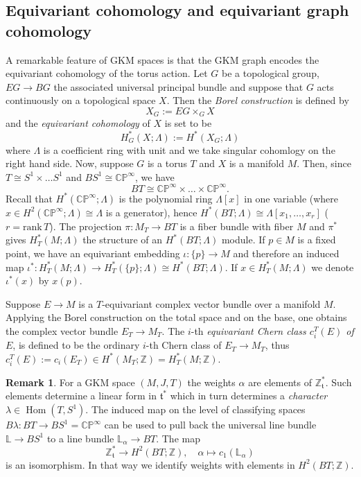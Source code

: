 \documentclass[12pt,a4paper]{amsart}
\theoremstyle{plain}
\theoremstyle{definition}
\newtheorem{rem}[thm]{Remark}
\begin{document}
\subsection{Equivariant cohomology and equivariant graph cohomology}
A remarkable feature of GKM spaces is that the GKM graph encodes the equivariant
cohomology of the torus action. Let $G$ be a topological group, $EG \to BG$ the associated universal principal bundle
and suppose that $G$ acts continuously on a topological space $X$. Then
the \emph{Borel construction} is defined by
\[
	X_{G} := EG \times_{G} X
\]
and the \emph{equivariant cohomology} of $X$ is set to be
\[
	H_{G}^{\ast}(X;\Lambda) := H^{\ast}(X_{G};\Lambda) 
\]
where $\Lambda$ is a coefficient ring with unit and we take singular cohomlogy on the
right hand side. Now, suppose $G$ is a torus $T$ and $X$ is a manifold $M$. Then, since $T
\cong S^{1} \times \ldots S^{1}$ and $BS^{1} \cong \mathbb C\mathbb P^{\infty}$, we have
\[
	BT \cong \mathbb C\mathbb P^{\infty} \times \ldots \times \mathbb C\mathbb P^{\infty}.
\]
Recall that $H^{\ast}(\mathbb C\mathbb P^{\infty}; \Lambda)$ is the polynomial ring
$\Lambda[x]$ in one variable (where $x \in H^{2}(\mathbb C\mathbb P^{\infty}; \Lambda)
\cong \Lambda$ is a generator), hence $H^{\ast}(BT; \Lambda) \cong \Lambda[x_{1}, \ldots,
x_{r}]$ ($r = \mathrm{rank}\, T$). The projection $\pi\colon M_{T} \to BT$ is a fiber bundle with fiber
$M$ and $\pi^*$ gives $H^{\ast}_{T}(M;\Lambda)$ the structure of an $H^{\ast}(BT;\Lambda)$
module. If $p \in M$ is a fixed point, we have an equivariant embedding $\iota \colon
\{p\} \to M$ and therefore an induced map $\iota^{\ast} \colon H^{\ast}_{T}(M;\Lambda) \to
H^{\ast}_{T}(\{p\};\Lambda) \cong H^{\ast}(BT;\Lambda)$. If $x \in
H_{T}^{\ast}(M;\Lambda)$ we denote $\iota^{\ast}(x)$ by $x(p)$.

Suppose $E \to M$ is a $T$-equivariant complex vector bundle over a manifold $M$.
Applying the Borel construction on the total space and on the base, one obtains the complex vector
bundle $E_{T} \to M_{T}$. The $i$-th \emph{equivariant Chern class $c_{i}^{T}(E)$ of $E$},
is defined to be the ordinary $i$-th Chern class of $E_{T} \to M_{T}$, thus $c_{i}^{T}(E) :=
c_{i}(E_{T}) \in H^{\ast}(M_{T};\mathbb{Z}) = H_{T}^{\ast}(M;\mathbb{Z})$.

\begin{rem}\label{R: weights and cohomology}
For a GKM space $(M,J,T)$ the weights $\alpha$ are elements of $\mathbb{Z}_{\mathfrak
t}^{\ast}$. Such elements determine a linear form in $\mathfrak t^{\ast}$ which in turn
determines a \emph{character} $\lambda \in \operatorname{Hom}(T, S^{1})$. The induced map
on the level of classifying spaces $B \lambda \colon BT \to BS^{1} = \mathbb C\mathbb
P^{\infty}$ can be used to pull back the universal line bundle $\mathbb{L} \to BS^{1}$ to a line
bundle $\mathbb{L}_{\alpha} \to BT$. The map
\[
	\mathbb{Z}_{\mathfrak t}^{\ast} \to H^{2}(BT;\mathbb{Z}), \quad \alpha \mapsto
	c_{1}(\mathbb{L}_{\alpha})
\]
is an isomorphism. In that way we identify weights
with elements in $H^{2}(BT;\mathbb{Z})$. 
\end{rem}
\end{document}
